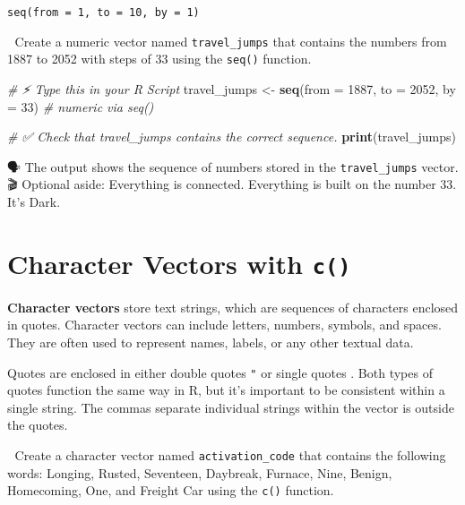 \documentclass[
  12pt,
]{scrreprt}
\newenvironment{Shaded}{\begin{snugshade}}{\end{snugshade}}
\newcommand{\AttributeTok}[1]{\textcolor[rgb]{0.13,0.29,0.53}{#1}}
\newcommand{\CommentTok}[1]{\textcolor[rgb]{0.56,0.35,0.01}{\textit{#1}}}
\newcommand{\DecValTok}[1]{\textcolor[rgb]{0.00,0.00,0.81}{#1}}
\newcommand{\FunctionTok}[1]{\textcolor[rgb]{0.13,0.29,0.53}{\textbf{#1}}}
\newcommand{\NormalTok}[1]{#1}
\newcommand{\OtherTok}[1]{\textcolor[rgb]{0.56,0.35,0.01}{#1}}
\begin{document}
\texttt{seq(from\ =\ 1,\ to\ =\ 10,\ by\ =\ 1)}

🎯 Create a numeric vector named \texttt{travel\_jumps} that contains
the numbers from 1887 to 2052 with steps of 33 using the \texttt{seq()}
function.

\begin{Shaded}
\begin{Highlighting}[]
\CommentTok{\# ⚡ Type this in your R Script}
\NormalTok{travel\_jumps }\OtherTok{\textless{}{-}} \FunctionTok{seq}\NormalTok{(}\AttributeTok{from =} \DecValTok{1887}\NormalTok{, }\AttributeTok{to =} \DecValTok{2052}\NormalTok{, }\AttributeTok{by =} \DecValTok{33}\NormalTok{)   }\CommentTok{\# numeric via seq()}
\end{Highlighting}
\end{Shaded}

\begin{Shaded}
\begin{Highlighting}[]
\CommentTok{\# ✅ Check that travel\_jumps contains the correct sequence.}
\FunctionTok{print}\NormalTok{(travel\_jumps)}
\end{Highlighting}
\end{Shaded}

🗣 The output shows the sequence of numbers stored in the
\texttt{travel\_jumps} vector. 🎬 Optional aside: Everything is
connected. Everything is built on the number 33. It's Dark.

\section{\texorpdfstring{Character Vectors with
\texttt{c()}}{Character Vectors with c()}}\label{character-vectors-with-c}

\textbf{Character vectors} store text strings, which are sequences of
characters enclosed in quotes. Character vectors can include letters,
numbers, symbols, and spaces. They are often used to represent names,
labels, or any other textual data.

Quotes are enclosed in either double quotes \texttt{"} or single quotes
\texttt{\textquotesingle{}}. Both types of quotes function the same way
in R, but it's important to be consistent within a single string. The
commas separate individual strings within the vector is outside the
quotes.

🎯 Create a character vector named \texttt{activation\_code} that
contains the following words: Longing, Rusted, Seventeen, Daybreak,
Furnace, Nine, Benign, Homecoming, One, and Freight Car using the
\texttt{c()} function.
\end{document}
